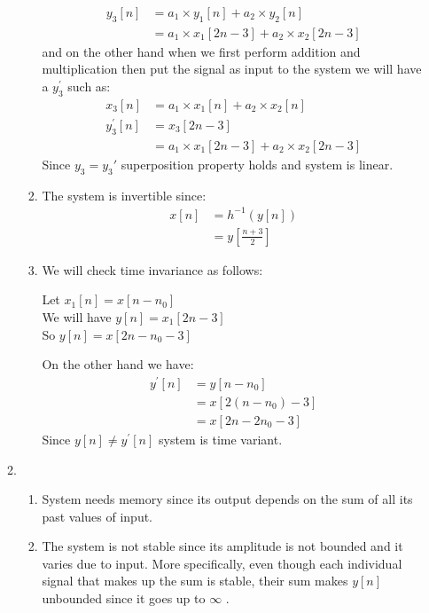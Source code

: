 \documentclass[10pt,a4paper, margin=1in]{article}
\begin{document}
\begin{enumerate}
\begin{enumerate}
\begin{enumerate}
            \begin{align*}
            y_3[n]&= a_1 \times y_1[n] + a_2 \times y_2[n] \\
                  &= a_1 \times x_1[2n-3]+ a_2 \times x_2[2n-3]
            \end{align*}
            and on the other hand when we first perform addition and multiplication then put the signal as input to the system we will have a $y_3^{'}$ such as:
            \begin{align*}
                x_3[n]&=a_1\times x_1[n] + a_2\times x_2[n] \\
                y_3^{'}[n]&=x_3[2n-3]\\
                &=a_1\times x_1[2n-3] + a_2\times x_2[2n-3]
            \end{align*}
            Since $y_3 = y_3'$ superposition property holds and system is linear.
        \item The system is invertible since:
        \begin{align*}
        x[n] &= h^{-1}(y[n]) \\
             &= y[\frac{n+3}{2}]
        \end{align*}
        \item We will check time invariance as follows:
        \begin{center}
        Let $x_1[n] = x[n-n_0]$ \\
        We will have $y[n]=x_1[2n-3]$ \\
        So $y[n] = x[2n-n_0-3]$
        \end{center}
        On the other hand we have: 
        \begin{align*}
        y^{'}[n] &= y[n-n_0]  \\
                 &= x[2(n-n_0)-3]\\
                 &= x[2n-2n_0-3]
        \end{align*}
        Since $y[n] \neq y^{'}[n]$ system is time variant. \\
        \end{enumerate}
    \item
    \begin{enumerate}
        \item
        System needs memory since its output depends on the sum of all its past values of input. 
        \item
        The system is not stable since its amplitude is not bounded and it varies due to input. More specifically, even though each individual signal that makes up the sum is stable, their sum makes $y[n]$ unbounded since it goes up to $\infty$ .

\end{enumerate}
\end{enumerate}
\end{enumerate}
\end{document}
